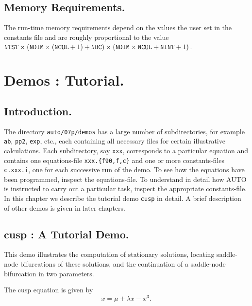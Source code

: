 \documentclass[12pt]{report}
\begin{document}
\section{ Memory Requirements.} \label{sec:Memory_requirements}
The run-time memory requirements depend on the values the user set in
the constants file and are roughly proportional to the value
${\tt NTST}\times({\tt NDIM}\times({\tt NCOL}+1)+{\tt NBC})\times
({\tt NDIM}\times{\tt NCOL}+{\tt NINT}+1)$.

\chapter{ \AUTO Demos : Tutorial.} \label{ch:Demos:_Tutorial}
\newpage
\section{ Introduction.} \label{sec:Tutorial_Introduction}
The directory {\tt auto/07p/demos} has a large number of subdirectories,
for example {\tt ab}, {\tt pp2}, {\tt exp}, etc.,
each containing all necessary files for certain illustrative calculations.
Each subdirectory, say {\tt xxx}, corresponds to a particular equation
and contains one equations-file {\tt xxx.\{f90,f,c\}}
and one or more constants-files {\tt c.xxx.i}, 
one for each successive run of the demo.
To see how the equations have been programmed, inspect the equations-file. 
To understand in detail how {\cal AUTO} is instructed to carry out a 
particular task, inspect the appropriate constants-file.
In this chapter we describe the tutorial demo {\tt cusp} in detail.
A brief description of other demos is given in later chapters.


\section{ cusp : A Tutorial Demo.} \label{sec:Demos_cusp}
This demo illustrates the computation of 
stationary solutions, locating saddle-node bifurcations of these
solutions, and the continuation of a saddle-node bifurcation in two
parameters.

The cusp equation is given by
\begin{equation}
  \dot x = \mu + \lambda x - x^3.
\end{equation}
\end{document}
